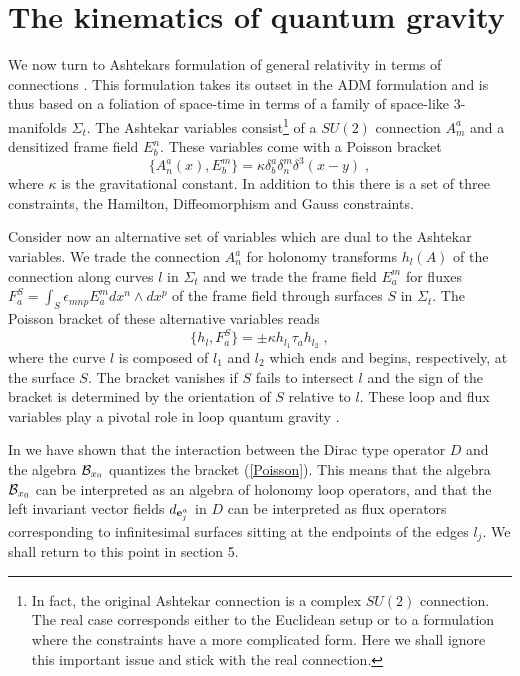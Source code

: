 \documentclass[12pt]{article}
\def\d{\delta}
\def\e{\epsilon}
\def\k{\kappa}
\def\t{\tau}
\def\cb{{\cal B}}
\begin{document}
\section{The kinematics of quantum gravity}



We now turn to Ashtekars formulation of general relativity in terms of connections \cite{Ashtekar:1986yd,Ashtekar:1987gu}. This formulation takes its outset in the ADM formulation and is thus based on a foliation of space-time in terms of a family of space-like 3-manifolds $\Sigma_t$. The Ashtekar variables consist\footnote{In fact, the original Ashtekar connection is a complex $SU(2)$ connection. The real case corresponds either to the Euclidean setup or to a formulation where the constraints have a more complicated form. Here we shall ignore this important issue and stick with the real connection.} of a $SU(2)$ connection $A_m^a$ and a densitized frame field $E^n_b$. 
These variables come with a Poisson bracket
$$
\{A_n^a(x),E_b^m\} = \k\delta^a_b\d_n^m \d^3(x-y)\;,
$$
where $\k$ is the gravitational constant. In addition to this there is a set of three constraints, the Hamilton,  Diffeomorphism and Gauss constraints.

Consider now an alternative set of variables which are dual to the Ashtekar variables. We trade the connection $A_n^a$ for holonomy transforms $h_l(A)$ of the connection along curves $l$ in $\Sigma_t$
 and we trade the frame field $E^{m}_a$ for fluxes $F^S_a=\int_S  \e_{mnp} E^m_a dx^n\wedge dx^p$ of the frame field through surfaces $S$ in $\Sigma_t$. The Poisson bracket of these alternative variables reads
 \begin{equation}
\{ h_l, F^S_a \} =  \pm \kappa h_{l_1}\t_a h_{l_2}\;,
\label{Poisson}
\end{equation}
where the curve $l$ is composed of $l_1$ and $l_2$ which ends and begins, respectively, at the surface $S$. The bracket vanishes if $S$ fails to intersect $l$ and the sign of the bracket is determined by the orientation of $S$ relative to $l$. These loop and flux variables play a pivotal role in loop quantum gravity \cite{AL1}. 

In \cite{AGN1,AGNP1} we have shown that the interaction between the Dirac type operator $D$ and the algebra $\cb_{x_0}$ quantizes the bracket (\ref{Poisson}). This means that the algebra $\cb_{x_0}$ can be interpreted as an algebra of holonomy loop operators, and that the left invariant vector fields $d_{{\bf e}_j^a}$ in $D$ can be interpreted as flux operators corresponding to infinitesimal surfaces sitting at the endpoints of the edges $l_j$. We shall return to this point in section 5.
\end{document}
